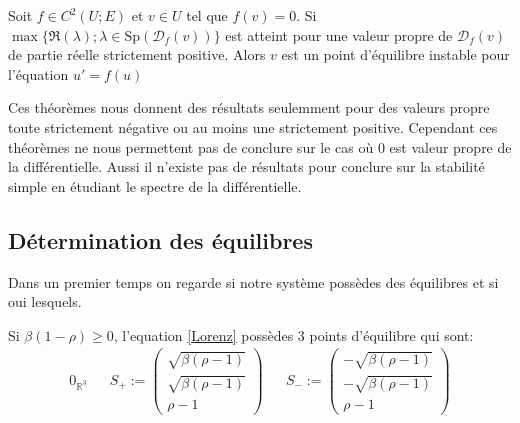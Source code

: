 \documentclass{article}
\newcommand*\colv[1]{
\left(\begin{array}{c}
    #1
\end{array}\right)
}
\newcommand{\R}{\mathbb{R}}
\newtheorem[M , nocut]{prop}{Proposition}[section]
\newtheorem[M]{propt}{Propriété}[section]
\newtheorem[L , nocut]{thm}{Théoreme}
\newtheorem[L]{cor}{Corollaire}
\begin{document}
\begin{thm}
    \label{thm:eq-instable}
    Soit $f\in C^2(U;E)$ et $v\in U$ tel que $f(v)=0$. Si $\max\{\Re(\lambda); \lambda\in \mathrm{Sp}(\mathcal{D}_f(v))\}$ est atteint pour une valeur propre de $\mathcal{D}_f(v)$ de partie réelle strictement positive. Alors $v$ est un point d'équilibre instable pour l'équation $u'=f(u)$
\end{thm}

Ces théorèmes nous donnent des résultats seulemment pour des valeurs propre toute strictement négative ou au moins une strictement positive. Cependant ces théorèmes ne nous permettent pas de conclure sur le cas où $0$ est valeur propre de la différentielle. Aussi il n'existe pas de résultats pour conclure sur la stabilité simple en étudiant le spectre de la différentielle.

\subsection{Détermination des équilibres}
Dans un premier temps on regarde si notre système possèdes des équilibres et si oui lesquels.
\begin{prop}
    Si $\beta(1-\rho) \ge 0$, l'equation \eqref{Lorenz} possèdes 3 points d'équilibre qui sont:
    \begin{align*}
        0_{\R^3} &&   S_+ :=\colv{\sqrt{ \beta (\rho -1)} \\ \sqrt{\beta (\rho -1)}\\ \rho -1}  &&  S_- := \colv{-\sqrt{ \beta (\rho -1)} \\ - \sqrt{\beta (\rho -1)}\\ \rho -1}
    \end{align*}
\end{prop}
\end{document}
